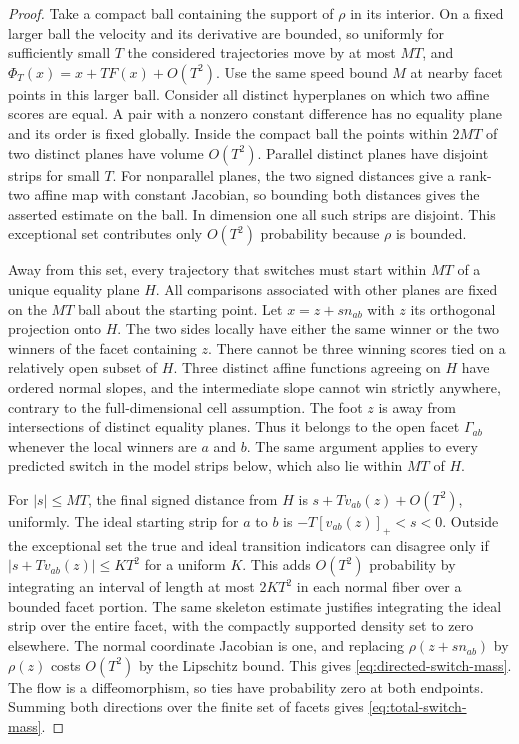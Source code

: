 \begin{proof}
Take a compact ball containing the support of $\rho$ in its interior.
On a fixed larger ball the velocity and its derivative are bounded, so
uniformly for sufficiently small $T$ the considered trajectories move
by at most $MT$, and $\Phi_T(x)=x+TF(x)+O(T^2)$. Use the same speed bound
$M$ at nearby facet points in this larger ball. Consider all distinct
hyperplanes on which two affine scores are equal. A pair with a nonzero
constant difference has no equality plane and its order is fixed
globally. Inside the compact ball the points within $2MT$ of two
distinct planes have volume $O(T^2)$. Parallel distinct planes have
disjoint strips for small $T$. For nonparallel planes, the two signed
distances give a rank-two affine map with constant Jacobian, so bounding
both distances gives the asserted estimate on the ball. In dimension one
all such strips are disjoint. This exceptional set contributes only
$O(T^2)$ probability because $\rho$ is bounded.

Away from this set, every trajectory that switches must start within
$MT$ of a unique equality plane $H$. All comparisons associated with
other planes are fixed on the $MT$ ball about the starting point. Let
$x=z+sn_{ab}$ with $z$ its orthogonal projection onto $H$. The two sides
locally have either the same winner or the two winners of the facet
containing $z$. There cannot be three winning scores tied on a relatively
open subset of $H$. Three distinct affine functions agreeing on $H$
have ordered normal slopes, and the intermediate slope cannot win
strictly anywhere, contrary to the full-dimensional cell assumption.
The foot $z$ is away from intersections of distinct equality planes.
Thus it belongs to the open facet $\Gamma_{ab}$ whenever the local
winners are $a$ and $b$. The same argument applies to every predicted
switch in the model strips below, which also lie within $MT$ of $H$.

For $|s|\le MT$, the final signed distance from $H$ is
$s+Tv_{ab}(z)+O(T^2)$, uniformly. The ideal starting strip for $a$ to $b$
is $-T[v_{ab}(z)]_+<s<0$. Outside the exceptional set the true and
ideal transition indicators can disagree only if
$|s+Tv_{ab}(z)|\le K T^2$ for a uniform $K$. This adds $O(T^2)$
probability by integrating an interval of length at most $2KT^2$ in
each normal fiber over a bounded facet portion. The same skeleton
estimate justifies integrating the ideal strip over the entire facet,
with the compactly supported density set to zero elsewhere. The normal
coordinate Jacobian is one, and replacing $\rho(z+sn_{ab})$ by $\rho(z)$
costs $O(T^2)$ by the Lipschitz bound. This gives
\eqref{eq:directed-switch-mass}. The flow is a diffeomorphism, so ties
have probability zero at both endpoints. Summing both directions over
the finite set of facets gives \eqref{eq:total-switch-mass}.
\end{proof}

